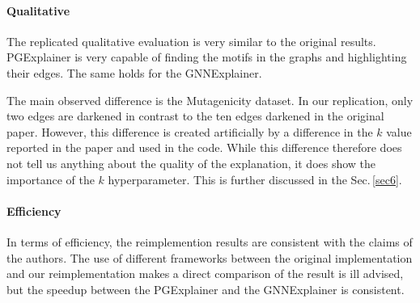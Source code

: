 \paragraph{Qualitative}
The replicated qualitative evaluation is very similar to the original results. PGExplainer is very capable of finding the motifs in the graphs and highlighting their edges. The same holds for the GNNExplainer. 

The main observed difference is the Mutagenicity dataset. In our replication, only two edges are darkened in contrast to the ten edges darkened in the original paper. However, this difference is created artificially by a difference in the $k$ value reported in the paper and used in the code. While this difference therefore does not tell us anything about the quality of the explanation, it does show the importance of the $k$ hyperparameter. This is further discussed in the Sec.\,\ref{sec6}.

\paragraph{Efficiency}
In terms of efficiency, the reimplemention results are consistent with the claims of the authors. The use of different frameworks between the original implementation and our reimplementation makes a direct comparison of the result is ill advised, but the speedup between the PGExplainer and the GNNExplainer is consistent.